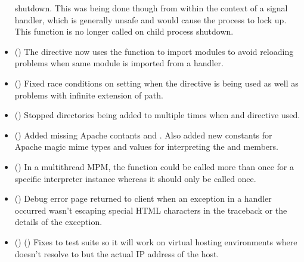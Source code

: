 \begin{itemize}
      shutdown. This was being done though from within the context of a
      signal handler, which is generally unsafe and would cause the process
      to lock up. This function is no longer called on child process shutdown.
    \item
      ()
      The  directive now uses the
       function to import modules to avoid
      reloading problems when same module is imported from a handler.
    \item
      ()
      Fixed race conditions on setting  when the
       directive is being used as well as problems with
      infinite extension of path.
    \item
      ()
      Stopped directories being added to  multiple times when
       and  directive used.
    \item
      ()
      Added missing Apache contants  and
      . Also added new constants for
      Apache magic mime types and values for interpreting the
       and  members.
    \item
      ()
      In a multithread MPM, the  function could be called
      more than once for a specific interpreter instance whereas it should
      only be called once.
    \item
      ()
      Debug error page returned to client when an exception in a handler
      occurred wasn't escaping special HTML characters in the traceback or
      the details of the exception.
    \item
      ()
      ()
      Fixes to test suite so it will work on virtual hosting environments
      where  doesn't resolve to  but the
      actual IP address of the host.
  \end{itemize}

